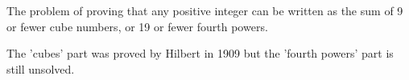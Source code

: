 The problem of proving that any positive integer can be written as the 
sum of 9 or fewer cube numbers, or 19 or fewer fourth powers.
\par
The 'cubes' part was proved by Hilbert in 1909 but the 'fourth powers'
part is still unsolved.